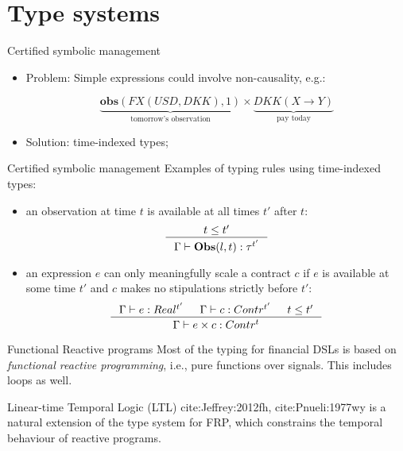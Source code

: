 \documentclass[aspectratio=169]{beamer}
\newcommand{\describe}[2]{\underbrace{#1}_{\text{#2}}}
\begin{document}
\section{Type systems}
\label{sec:org53240fe}
\begin{frame}[label={sec:org64cee1b}]{Certified symbolic management}
\begin{itemize}
\item \alert{Problem}: Simple expressions could involve non-causality, e.g.:

$$\describe{\textbf{obs}(FX(USD, DKK), 1)}{tomorrow's observation} \times \describe{DKK(X \rightarrow Y)}{pay today}$$

\item \alert{Solution}: time-indexed types;
\end{itemize}
\end{frame}

\begin{frame}[label={sec:org3ae9727}]{Certified symbolic management}
\alert{Examples} of typing rules using time-indexed types:

\begin{itemize}
\item an observation at time \(t\) is available at all times \(t'\) after \(t\):
$$\inference{t \leq t'}{\Gamma |- \textbf{Obs}(l,t) : \tau^{t'}}$$

\item an expression \(e\) can only meaningfully scale a contract \(c\) if \(e\) is
available at some time \(t'\) and \(c\) makes no stipulations strictly before
\(t'\): $$\inference{\Gamma |- e: Real^{t'} & \Gamma |- c: Contr^{t'} & t \leq t'}{\Gamma |- e \times c:
  Contr^t}$$
\end{itemize}
\end{frame}

\begin{frame}[label={sec:orgd94f20b}]{Functional Reactive programs}
Most of the typing for financial DSLs is based on \emph{functional reactive programming}, i.e.,
pure functions over signals. This includes loops as well.

Linear-time Temporal Logic (LTL) cite:Jeffrey:2012fh, cite:Pnueli:1977wy is a
natural extension of the type system for FRP, which constrains the temporal
behaviour of reactive programs.
\end{frame}
\end{document}
